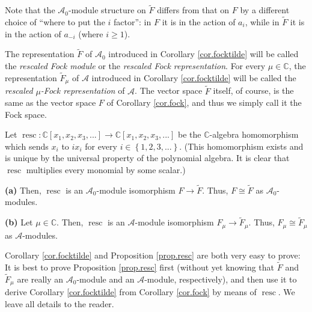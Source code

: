 \documentclass[etingof-lie.tex]{subfiles}
\begin{document}
Note that the $\mathcal{A}_{0}$-module structure on $\widetilde{F}$ differs
from that on $F$ by a different choice of ``where to put the $i$ factor'': in
$F$ it is in the action of $a_{i}$, while in $\widetilde{F}$ it is in the
action of $a_{-i}$ (where $i\geq1$).

\begin{definition}
\label{def.focktilde}The representation $\widetilde{F}$ of $\mathcal{A}_{0}$
introduced in Corollary \ref{cor.focktilde} will be called the
\textit{rescaled Fock module} or the \textit{rescaled Fock representation}.
For every $\mu\in\mathbb{C}$, the representation $\widetilde{F}_{\mu}$ of
$\mathcal{A}$ introduced in Corollary \ref{cor.focktilde} will be called the
\textit{rescaled }$\mu$\textit{-Fock representation} of $\mathcal{A}$. The
vector space $\widetilde{F}$ itself, of course, is the same as the vector
space $F$ of Corollary \ref{cor.fock}, and thus we simply call it the Fock space.
\end{definition}

\begin{proposition}
\label{prop.resc}Let $\operatorname*{resc}:\mathbb{C}\left[  x_{1},x_{2}%
,x_{3},...\right]  \rightarrow\mathbb{C}\left[  x_{1},x_{2},x_{3},...\right]
$ be the $\mathbb{C}$-algebra homomorphism which sends $x_{i}$ to $ix_{i}$ for
every $i\in\left\{  1,2,3,...\right\}  $. (This homomorphism exists and is
unique by the universal property of the polynomial algebra. It is clear that
$\operatorname*{resc}$ multiplies every monomial by some scalar.)

\textbf{(a)} Then, $\operatorname*{resc}$ is an $\mathcal{A}_{0}$-module
isomorphism $F\rightarrow\widetilde{F}$. Thus, $F\cong\widetilde{F}$ as
$\mathcal{A}_{0}$-modules.

\textbf{(b)} Let $\mu\in\mathbb{C}$. Then, $\operatorname*{resc}$ is an
$\mathcal{A}$-module isomorphism $F_{\mu}\rightarrow\widetilde{F}_{\mu}$.
Thus, $F_{\mu}\cong\widetilde{F}_{\mu}$ as $\mathcal{A}$-modules.
\end{proposition}

Corollary \ref{cor.focktilde} and Proposition \ref{prop.resc} are both very
easy to prove: It is best to prove Proposition \ref{prop.resc} first (without
yet knowing that $\widetilde{F}$ and $\widetilde{F}_{\mu}$ are really an
$\mathcal{A}_{0}$-module and an $\mathcal{A}$-module, respectively), and then
use it to derive Corollary \ref{cor.focktilde} from Corollary \ref{cor.fock}
by means of $\operatorname*{resc}$. We leave all details to the reader.
\end{document}

